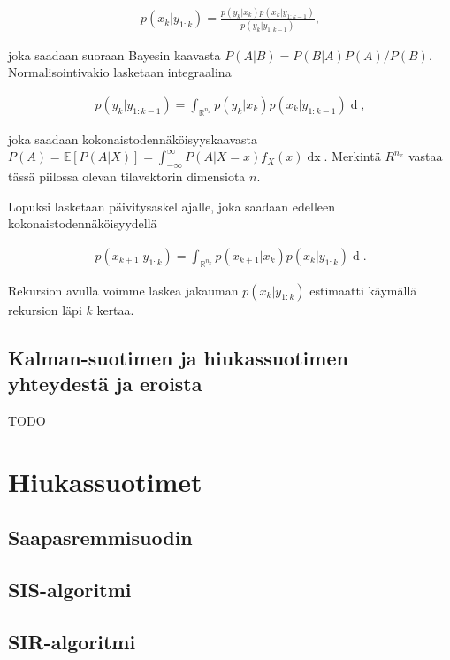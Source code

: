\documentclass[
  12pt,
  a4paper, twoside]{book}
\begin{document}
\begin{align}\label{bayes-paivitys}
p(x_k|y_{1:k}) = \frac{p(y_k|x_k)p(x_k|y_{1:k-1})}{p(y_k|y_{1:k-1})},
\end{align}

\noindent joka saadaan suoraan Bayesin kaavasta \(P(A|B)=P(B|A)P(A)/P(B)\). Normalisointivakio lasketaan integraalina

\begin{align}\label{bayes-normalisointi}
p(y_k|y_{1:k-1})=\int_{\mathbb{R}^{n_x}}p(y_k|x_k)p(x_k|y_{1:k-1})\mathop{dx_k},
\end{align}

\noindent joka saadaan kokonaistodennäköisyyskaavasta \(P(A)=\mathbb{E}[P(A|X)]=\int_{-\infty}^{\infty}P(A|X=x)f_X(x)\mathop{dx}\). Merkintä \({R}^{n_x}\) vastaa tässä piilossa olevan tilavektorin dimensiota \(n\).

Lopuksi lasketaan päivitysaskel ajalle, joka saadaan edelleen kokonaistodennäköisyydellä

\begin{align}\label{bayes-aikapaivitys}
p(x_{k+1}|y_{1:k})=\int_{\mathbb{R}^{n_x}}p(x_{k+1}|x_k)p(x_k|y_{1:k})\mathop{dx_k}.
\end{align}

\noindent Rekursion avulla voimme laskea jakauman \(p(x_k|y_{1:k})\) estimaatti käymällä rekursion läpi \(k\) kertaa.

\section{Kalman-suotimen ja hiukassuotimen yhteydestä ja eroista}

TODO

\chapter{Hiukassuotimet}

\section{Saapasremmisuodin}

\section{SIS-algoritmi}

\section{SIR-algoritmi}
\end{document}
